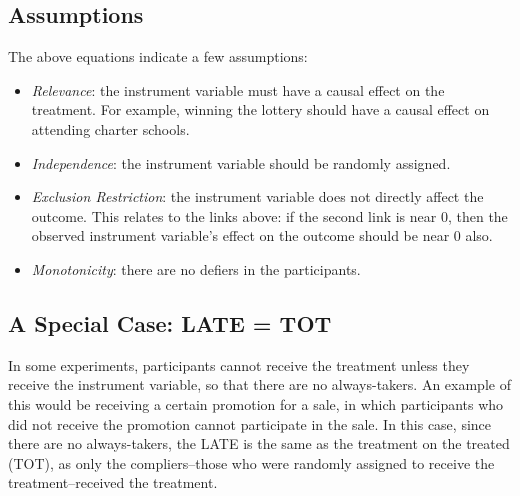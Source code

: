 \documentclass{article}
\begin{document}
\subsection{Assumptions}
The above equations indicate a few assumptions:
\begin{itemize}
    \item \textit{Relevance}: the instrument variable must have a causal effect on the treatment. For example, winning the lottery should have a causal effect on attending charter schools.
    \item \textit{Independence}: the instrument variable should be randomly assigned.
    \item \textit{Exclusion Restriction}: the instrument variable does not directly affect the outcome. This relates to the links above: if the second link is near 0, then the observed instrument variable's effect on the outcome should be near 0 also.
    \item \textit{Monotonicity}: there are no defiers in the participants. 
\end{itemize}

\subsection{A Special Case: LATE = TOT}
In some experiments, participants cannot receive the treatment unless they receive the instrument variable, so that there are no always-takers. 
An example of this would be receiving a certain promotion for a sale, in which participants who did not receive the promotion cannot participate in the sale. 
In this case, since there are no always-takers, the LATE is the same as the treatment on the treated (TOT), as only the compliers–those who were randomly assigned to receive the treatment–received the treatment. 
\end{document}
